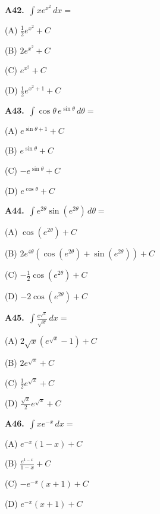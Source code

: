 \documentclass[11pt]{article}
\begin{document}
\bigskip\noindent\textbf{A42.}\ $\displaystyle\int xe^{x^2}\,dx=$
\begin{list}{}{\setlength{\leftmargin}{3em}\setlength{\labelwidth}{2.5em}\setlength{\itemsep}{0pt}\setlength{\topsep}{2pt}}
\item[(A)] $\frac12e^{x^2}+C$
\item[(B)] $2e^{x^2}+C$
\item[(C)] $e^{x^2}+C$
\item[(D)] $\frac12e^{x^2+1}+C$
\end{list}

\bigskip\noindent\textbf{A43.}\ $\displaystyle\int \cos\theta\,e^{\sin\theta}\,d\theta=$
\begin{list}{}{\setlength{\leftmargin}{3em}\setlength{\labelwidth}{2.5em}\setlength{\itemsep}{0pt}\setlength{\topsep}{2pt}}
\item[(A)] $e^{\sin\theta+1}+C$
\item[(B)] $e^{\sin\theta}+C$
\item[(C)] $-e^{\sin\theta}+C$
\item[(D)] $e^{\cos\theta}+C$
\end{list}

\bigskip\noindent\textbf{A44.}\ $\displaystyle\int e^{2\theta}\sin(e^{2\theta})\,d\theta=$
\begin{list}{}{\setlength{\leftmargin}{3em}\setlength{\labelwidth}{2.5em}\setlength{\itemsep}{0pt}\setlength{\topsep}{2pt}}
\item[(A)] $\cos(e^{2\theta})+C$
\item[(B)] $2e^{4\theta}(\cos(e^{2\theta})+\sin(e^{2\theta}))+C$
\item[(C)] $-\frac12\cos(e^{2\theta})+C$
\item[(D)] $-2\cos(e^{2\theta})+C$
\end{list}

\bigskip\noindent\textbf{A45.}\ $\displaystyle\int \frac{e^{\sqrt x}}{\sqrt x}\,dx=$
\begin{list}{}{\setlength{\leftmargin}{3em}\setlength{\labelwidth}{2.5em}\setlength{\itemsep}{0pt}\setlength{\topsep}{2pt}}
\item[(A)] $2\sqrt x(e^{\sqrt x}-1)+C$
\item[(B)] $2e^{\sqrt x}+C$
\item[(C)] $\frac12e^{\sqrt x}+C$
\item[(D)] $\frac{\sqrt x}2e^{\sqrt x}+C$
\end{list}

\bigskip\noindent\textbf{A46.}\ $\displaystyle\int xe^{-x}\,dx=$
\begin{list}{}{\setlength{\leftmargin}{3em}\setlength{\labelwidth}{2.5em}\setlength{\itemsep}{0pt}\setlength{\topsep}{2pt}}
\item[(A)] $e^{-x}(1-x)+C$
\item[(B)] $\frac{e^{1-x}}{1-x}+C$
\item[(C)] $-e^{-x}(x+1)+C$
\item[(D)] $e^{-x}(x+1)+C$
\end{list}
\end{document}
